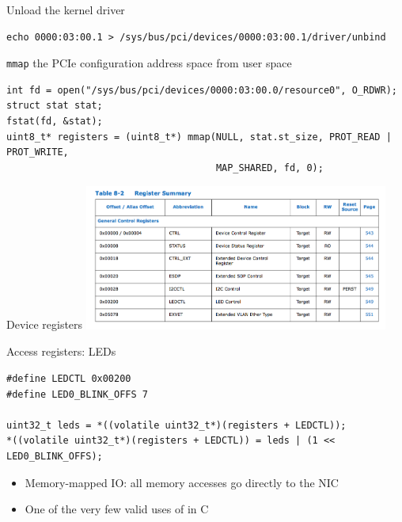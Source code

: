 \documentclass[NET,english,aspectratio=169,notitleframe]{tumbeamer}
\begin{document}
\begin{frame}[fragile=singleslide]{Unload the kernel driver}
\begin{verbatim}
echo 0000:03:00.1 > /sys/bus/pci/devices/0000:03:00.1/driver/unbind
\end{verbatim}
\end{frame}

\begin{frame}[fragile=singleslide]{\texttt{mmap} the PCIe configuration address space from user space}
\begin{verbatim}
int fd = open("/sys/bus/pci/devices/0000:03:00.0/resource0", O_RDWR);
struct stat stat;
fstat(fd, &stat);
uint8_t* registers = (uint8_t*) mmap(NULL, stat.st_size, PROT_READ | PROT_WRITE,
                                     MAP_SHARED, fd, 0);
\end{verbatim}
\end{frame}

\begin{frame}{Device registers}
\centering\includegraphics[width=0.75\textwidth]{pics/registers}
\end{frame}

\begin{frame}[fragile=singleslide]{Access registers: LEDs}
\begin{verbatim}
#define LEDCTL 0x00200
#define LED0_BLINK_OFFS 7

uint32_t leds = *((volatile uint32_t*)(registers + LEDCTL));
*((volatile uint32_t*)(registers + LEDCTL)) = leds | (1 << LED0_BLINK_OFFS);
\end{verbatim}
\begin{itemize}
\item Memory-mapped IO: all memory accesses go directly to the NIC
\item One of the very few valid uses of  in C
\end{itemize}
\end{frame}
\end{document}
